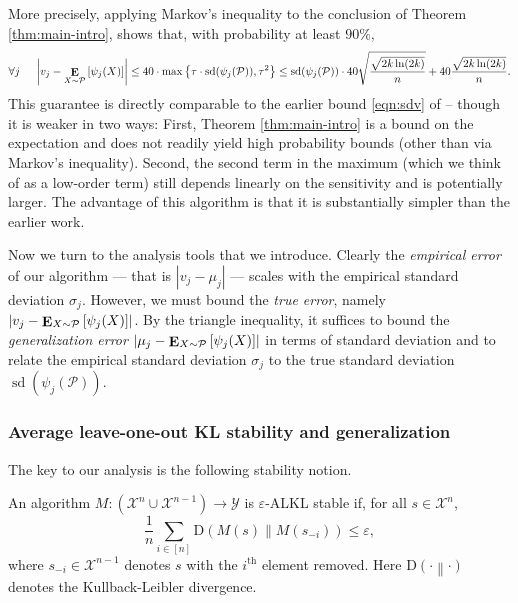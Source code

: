 \documentclass[final,12pt]{colt2018}
\newcommand{\ex}[2]{{\ifx&#1& \E \else \E_{#1} \fi \left[#2\right]}}
\newcommand{\sdv}{\mathop{\mathrm{sd}}}
\newcommand{\dkl}[2]{\mathrm{D}\left(#1\middle\|#2\right)}
\providecommand\X{\mathcal{X}}
\providecommand{\cP}{{\mathcal P}}
\newcommand{\mymax}[2]{\max\left\{#1,#2\right\}}
\begin{document}
More precisely, applying Markov's inequality to the conclusion of Theorem \ref{thm:main-intro}, shows that, with probability at least $90\%$, \begin{equation}\forall j ~~~~ \left| v_j - \ex{X \sim \cP}{\psi_j(X)} \right| \leq 40 \cdot \mymax{\tau \cdot \sdv(\psi_j(\cP))}{\tau^2} \leq \sdv(\psi_j(\cP)) \cdot 40\sqrt{\frac{\sqrt{2k \ln (2k)}}{n}} + 40 {\frac{\sqrt{2k \ln (2k)}}{n}}.\label{eqn:sdv2}\end{equation}
This guarantee is directly comparable to the earlier bound \eqref{eqn:sdv} of \citet{FeldmanS17} -- though it is weaker in two ways: First, Theorem \ref{thm:main-intro} is a bound on the expectation and does not readily yield high probability bounds (other than via Markov's inequality). Second, the second term in the maximum (which we think of as a low-order term) still depends linearly on the sensitivity and is potentially larger. The advantage of this algorithm is that it is substantially simpler than the earlier work.

\medskip

Now we turn to the analysis tools that we introduce. Clearly the \emph{empirical error} of our algorithm --- that is $|v_j - \mu_j|$ --- scales with the empirical standard deviation $\sigma_j$. However, we must bound the \emph{true error}, namely $|v_j - \ex{X \sim \cP}{\psi_j(X)}|$. By the triangle inequality, it suffices to bound the \emph{generalization error} $| \mu_j - \ex{X \sim \cP}{\psi_j(X)}|$ in terms of standard deviation and to relate the empirical standard deviation $\sigma_j$ to the true standard deviation $\sdv(\psi_j(\cP))$.


\subsubsection{Average leave-one-out KL stability and generalization}
The key to our analysis is the following stability notion.

\newcommand{\KLAS}{ALKL stable}
\begin{defn}\label{defn:klas-intro}
An algorithm $M : \left(\X^n \cup \X^{n-1} \right) \to \mathcal{Y}$ is $\varepsilon$-\KLAS{} if, for all $s \in \X^n$, $$\frac{1}{n} \sum_{i \in [n]} \dkl{M(s)}{M(s_{-i})} \leq \varepsilon,$$ where $s_{-i} \in \X^{n-1}$ denotes $s$ with the $i^\text{th}$ element removed. Here $\dkl{\cdot}{\cdot}$ denotes the Kullback-Leibler divergence.%
\end{defn}
\end{document}
